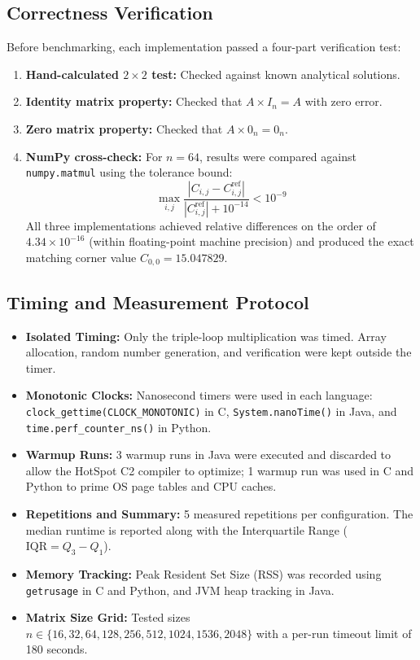 \documentclass[10pt,conference,a4paper]{IEEEtran}
\begin{document}
\subsection{Correctness Verification}
Before benchmarking, each implementation passed a four-part verification test:
\begin{enumerate}
    \item \textbf{Hand-calculated $2 \times 2$ test:} Checked against known analytical solutions.
    \item \textbf{Identity matrix property:} Checked that $A \times I_n = A$ with zero error.
    \item \textbf{Zero matrix property:} Checked that $A \times 0_n = 0_n$.
    \item \textbf{NumPy cross-check:} For $n=64$, results were compared against \texttt{numpy.matmul} using the tolerance bound:
    \begin{equation}
    \max_{i,j} \frac{|C_{i,j} - C^{\text{ref}}_{i,j}|}{|C^{\text{ref}}_{i,j}| + 10^{-14}} < 10^{-9}
    \end{equation}
    All three implementations achieved relative differences on the order of $4.34 \times 10^{-16}$ (within floating-point machine precision) and produced the exact matching corner value $C_{0,0} = 15.047829$.
\end{enumerate}
 
\subsection{Timing and Measurement Protocol}
\begin{itemize}
    \item \textbf{Isolated Timing:} Only the triple-loop multiplication was timed. Array allocation, random number generation, and verification were kept outside the timer.
    \item \textbf{Monotonic Clocks:} Nanosecond timers were used in each language: \texttt{clock\_gettime(CLOCK\_MONOTONIC)} in C, \texttt{System.nanoTime()} in Java, and \texttt{time.perf\_counter\_ns()} in Python.
    \item \textbf{Warmup Runs:} 3 warmup runs in Java were executed and discarded to allow the HotSpot C2 compiler to optimize; 1 warmup run was used in C and Python to prime OS page tables and CPU caches.
    \item \textbf{Repetitions and Summary:} 5 measured repetitions per configuration. The median runtime is reported along with the Interquartile Range ($\text{IQR} = Q_3 - Q_1$).
    \item \textbf{Memory Tracking:} Peak Resident Set Size (RSS) was recorded using \texttt{getrusage} in C and Python, and JVM heap tracking in Java.
    \item \textbf{Matrix Size Grid:} Tested sizes $n \in \{16, 32, 64, 128, 256, 512, 1024, 1536, 2048\}$ with a per-run timeout limit of 180 seconds.
\end{itemize}
\end{document}
